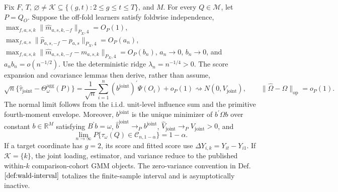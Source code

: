 Fix \(F\), \(T\), \(\varnothing\ne\mathcal K\subseteq\{(g,t):2\le g\le t\le T\}\), and \(M\). For every \(Q\in\mathcal M\), let \(P=Q_O\). Suppose the off-fold learners satisfy foldwise independence, \(\max_{f,a,s,k}\|\widehat m_{a,s,k,-f}\|_{P_X,4}=O_P(1)\), \(\max_{f,a,s}\|\widehat p_{a,s,-f}-p_{a,s}\|_{P_X,4}=O_P(a_n)\), \(\max_{f,a,s,k}\|\widehat m_{a,s,k,-f}-m_{a,s,k}\|_{P_X,4}=O_P(b_n)\), \(a_n\to0\), \(b_n\to0\), and \(a_nb_n=o(n^{-1/2})\). Use the deterministic ridge \(\lambda_n=n^{-1/4}>0\). The score expansion and covariance lemmas then derive, rather than assume, \[\sqrt n\{\widehat\tau_{\mathrm{joint}}-\Theta_\omega^{\mathrm{agg}}(P)\}=\frac{1}{\sqrt n}\sum_{i=1}^n(b^{\mathrm{joint}})^{\prime}\Psi(O_i)+o_P(1)\rightsquigarrow N(0,V_{\mathrm{joint}}),\qquad \|\widehat\Omega-\Omega\|_{\mathrm{op}}=o_P(1).\] The normal limit follows from the i.i.d. unit-level influence sum and the primitive fourth-moment envelope. Moreover, \(b^{\mathrm{joint}}\) is the unique minimizer of \(b^{\prime}\Omega b\) over constant \(b\in\mathbb R^M\) satisfying \(B^{\prime}b=\omega\), \(\widehat b^{\mathrm{joint}}\to_Pb^{\mathrm{joint}}\), \(\widehat V_{\mathrm{joint}}\to_PV_{\mathrm{joint}}>0\), and \[\lim_{n\to\infty}P\{\tau_\omega(Q)\in\mathcal C_{n,1-\alpha}\}=1-\alpha.\] If a target coordinate has \(g=2\), its score and fitted score use \(\Delta Y_{i,k}=Y_{it}-Y_{i1}\). If \(\mathcal K=\{k\}\), the joint loading, estimator, and variance reduce to the published within-\(k\) comparison-cohort GMM objects. The zero-variance convention in \(\mathrm{Def.}\) \(\ref{def:wald-interval}\) totalizes the finite-sample interval and is asymptotically inactive.